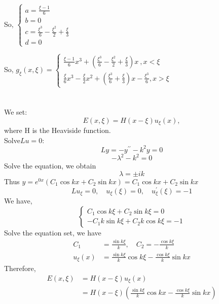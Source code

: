 \documentclass{article}
\begin{document}
So, $\left\{\begin{array}{l}a=\frac{\xi{}-1}{6} \\
b=0 \\
c=\frac{{\xi{}}^3}{6}-\frac{{\xi{}}^2}{2}+\frac{\xi{}}{3} \\
d=0\end{array}\right.$

So,
$g_{\xi{}}\left(x,\xi{}\right)=\left\{\begin{array}{l}\frac{\xi{}-1}{6}x^3+(\frac{{\xi{}}^3}{6}-\frac{{\xi{}}^2}{2}+\frac{\xi{}}{3})x\
,x<\xi{} \\
\frac{\xi{}}{6}x^3-\frac{\xi{}}{2}x^2+\left(\frac{{\xi{}}^3}{6}+\frac{\xi{}}{3}\right)x-\frac{{\xi{}}^3}{6},x>\xi{}\end{array}\right.$

\section{}
\subsection{}
We set: $$E ( x , \xi ) = H ( x - \xi ) u _ { \xi } ( x ),$$
	where H is the Heaviside function.
	\\Solve\quad$ L u = 0$:
    $$L y = - y ^ { \prime \prime } - k ^ { 2 } y = 0$$
    $$- \lambda ^ { 2 } - k ^ { 2 } = 0$$
    Solve the equation, we obtain $$\lambda = \pm i k$$
    Thus $y = e ^ { 0 x } \left( C _ { 1 } \cos k x + C _ { 2 } \sin k x \right)=C _ { 1 } \cos k x + C _ { 2 } \sin k x$
    $$L u _ { \xi } = 0,\quad u _ { \xi } ( \xi ) = 0 , \quad u _ { \xi } ^ { \prime } ( \xi ) = -1 $$
    We have, $$
    \left\{ \begin{array} { l } {  C _ { 1 } \cos k \xi + C _ { 2 } \sin k \xi = 0 } \\ { -  C _ { 1 } k \sin k \xi + C _ { 2 } k \cos k \xi = - 1 } \end{array} \right.
    $$
    Solve the equation set, we have$$
    \begin{aligned} C _ { 1 } & = \frac { \sin k \xi } { k } ,\quad  C _ { 2 } = - \frac { \cos k \xi } { k } \\ u _ { \xi } ( x ) & = \frac { \sin k \xi } { k } \cos  k \xi  - \frac { \cos k \xi } { k } \sin k x \end{aligned}
    $$
    Therefore, $$
    \begin{aligned} E ( x , \xi ) & = H ( x - \xi ) u _ { \xi } ( x ) \\ & = H ( x - \xi ) ( \frac { \sin k \xi } { k } \cos k x - \frac { \cos k \xi } { k } \sin k x ) \end{aligned}
    $$
\end{document}
